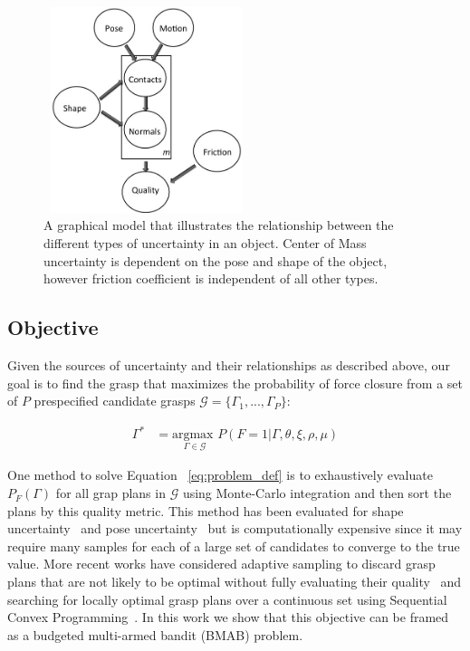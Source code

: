 \documentclass[journal,transmag]{IEEEtran}%
\newcommand{\mG}{\mathcal{G}}
\begin{document}
\begin{figure}[ht!]
\centering
\includegraphics[width = 6cm, height = 6cm]{figures/Graphical_Model.jpg}
\caption{A graphical model that illustrates the relationship between the different types of uncertainty in an object. Center of Mass uncertainty is dependent on the pose and shape of the object, however friction coefficient is independent of all other types. }
\vspace*{-10pt}
\label{fig:graphical_model}
\end{figure}

\subsection{Objective}

Given the sources of uncertainty and their relationships as described above, our goal is to find the grasp that maximizes the probability of force closure from a set of $P$ prespecified candidate grasps $\mG = \{\Gamma_1, ..., \Gamma_P\}$:

\vspace{-2ex}
\begin{align}
\Gamma^* &= \underset{\Gamma \in \mG}{\text{argmax }} P\left( F = 1 | \Gamma, \theta, \xi, \rho, \mu \right) \label{eq:problem_def}
\end{align}

One method to solve Equation ~\ref{eq:problem_def} is to exhaustively evaluate $P_F(\Gamma)$ for all grap plans in $\mG$ using Monte-Carlo integration and then sort the plans by this quality metric.
This method has been evaluated for shape uncertainty~\cite{christopoulos2007handling, kehoe2012estimating} and pose uncertainty~\cite{weisz2012pose} but is computationally expensive since it may require many samples for each of a large set of candidates to converge to the true value.
More recent works have considered adaptive sampling to discard grasp plans that are not likely to be optimal without fully evaluating their quality~\cite{kehoe2012toward} and searching for locally optimal grasp plans over a continuous set using Sequential Convex Programming~\cite{mahler2015opt}.
In this work we show that this objective can be framed as a budgeted multi-armed bandit (BMAB) problem.
\end{document}
